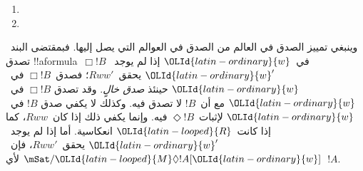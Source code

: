 \documentclass[../../../include/open-logic-section]{subfiles}
\begin{document}
\begin{defn}
\begin{enumerate}
{{    أو لا~$\mSat{{\OLId{latin-looped}{M}}}{!B}[{\OLId{latin-ordinary}{w}}]$ ولا~$\mSat{{\OLId{latin-looped}{M}}}{!C}[{\OLId{latin-ordinary}{w}}]$}.}{}
  \item{}
  \item{}
  \end{enumerate}
\end{defn}

وينبغي تمييز الصدق في العالم من الصدق في العوالم التي يصل إليها.
فبمقتضى البند~ تصدق
!!a{formula}~$\Box !B$ في~${\OLId{latin-ordinary}{w}}$ إذا لم يوجد~${\OLId{latin-ordinary}{w}}'$ يحقق~$Rww'$؛
فصدق~$\Box !B$ في~${\OLId{latin-ordinary}{w}}$ حينئذ \emph{صدق خالٍ}. وقد تصدق
$\Box !B$ في~${\OLId{latin-ordinary}{w}}$ مع أن~$!B$ لا تصدق فيه. وكذلك لا يكفي صدق
$!B$ في~${\OLId{latin-ordinary}{w}}$ لإثبات~$\Diamond !B$ فيه. وإنما يكفي ذلك إذا كان~$Rww$،
كما إذا كانت~${\OLId{latin-looped}{R}}$ انعكاسية. أما إذا لم يوجد~${\OLId{latin-ordinary}{w}}'$ يحقق~$Rww'$،
فإن~$\mSat/{{\OLId{latin-looped}{M}}}{\Diamond !A}[{\OLId{latin-ordinary}{w}}]$ لأي~$!A$.
\end{document}
